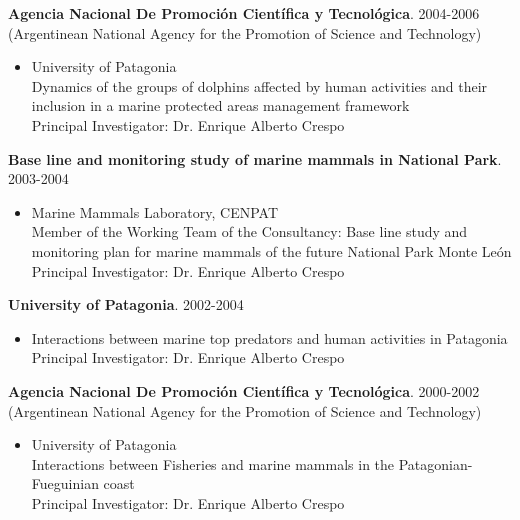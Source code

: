\documentclass{res}
\begin{document}
\begin{resume}
\textbf{Agencia Nacional De Promoci\'{o}n Cient\'{i}fica y Tecnol\'{o}gica}. 2004-2006\\
(Argentinean National Agency for the Promotion of Science and Technology)
\begin{itemize} %
	\item[] University of Patagonia\\
Dynamics of the groups of dolphins affected by human activities and their inclusion in a marine protected areas management framework\\ 
Principal Investigator: Dr. Enrique Alberto Crespo
\end{itemize}

\textbf{Base line and monitoring study of marine mammals in National Park}. 2003-2004
\begin{itemize} %
	\item[] Marine Mammals Laboratory, CENPAT\\
Member of the Working Team of the Consultancy: Base line study and monitoring plan for marine mammals of the future National Park Monte Le\'{o}n\\
Principal Investigator: Dr. Enrique Alberto Crespo
\end{itemize}

\textbf{University of Patagonia}. 2002-2004
\begin{itemize} %
	\item[] Interactions between marine top predators and human activities in Patagonia\\
Principal Investigator: Dr. Enrique Alberto Crespo
\end{itemize}



\textbf{Agencia Nacional De Promoci\'{o}n Cient\'{i}fica y Tecnol\'{o}gica}. 2000-2002\\
(Argentinean National Agency for the Promotion of Science and Technology)
\begin{itemize} %
	\item[] University of Patagonia\\
Interactions between Fisheries and marine mammals in the Patagonian-Fueguinian coast\\
Principal Investigator: Dr. Enrique Alberto Crespo
\end{itemize}



\end{resume}
\end{document}
